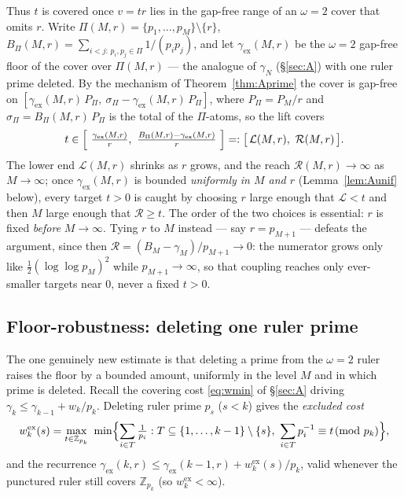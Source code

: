 \documentclass[11pt]{amsart}
\theoremstyle{plain}
\theoremstyle{definition}
\newcommand{\Z}{\mathbb{Z}}
\begin{document}
Thus $t$ is covered once $v=tr$ lies in the gap-free range of an $\omega=2$ cover
that omits $r$.  Write $\Pi(M,r)=\{p_1,\dots,p_M\}\setminus\{r\}$,
$B_\Pi(M,r)=\sum_{i<j:\,p_i,p_j\in\Pi}1/(p_ip_j)$, and let
$\gamma_{\mathrm{ex}}(M,r)$ be the $\omega=2$ gap-free floor of the cover over
$\Pi(M,r)$ --- the analogue of $\gamma_N$ (\S\ref{sec:A}) with one ruler prime
deleted.  By the mechanism of Theorem~\ref{thm:Aprime} the cover is gap-free on
$[\gamma_{\mathrm{ex}}(M,r)\,P_\Pi,\ \sigma_\Pi-\gamma_{\mathrm{ex}}(M,r)\,P_\Pi]$,
where $P_\Pi=P_M/r$ and $\sigma_\Pi=B_\Pi(M,r)\,P_\Pi$ is the total of the
$\Pi$-atoms, so the lift covers
\[
  t\in\Bigl[\ \tfrac{\gamma_{\mathrm{ex}}(M,r)}{r},\ \tfrac{B_\Pi(M,r)-\gamma_{\mathrm{ex}}(M,r)}{r}\ \Bigr]
  =:\bigl[\,\mathcal{L}(M,r),\ \mathcal{R}(M,r)\,\bigr].
\]
The lower end $\mathcal{L}(M,r)$ shrinks as $r$ grows, and the reach $\mathcal{R}(M,r)\to\infty$ as
$M\to\infty$; once $\gamma_{\mathrm{ex}}(M,r)$ is bounded \emph{uniformly in $M$
and $r$} (Lemma~\ref{lem:Aunif} below), every target $t>0$ is caught by choosing
$r$ large enough that $\mathcal{L}<t$ and then $M$ large enough that $\mathcal{R}\ge t$.  The
order of the two choices is essential: $r$ is fixed \emph{before} $M\to\infty$.
Tying $r$ to $M$ instead --- say $r=p_{M+1}$ --- defeats the argument, since then
$\mathcal{R}=(B_M-\gamma_M)/p_{M+1}\to0$: the numerator grows only like
$\tfrac12(\log\log p_M)^2$ while $p_{M+1}\to\infty$, so that coupling reaches only
ever-smaller targets near $0$, never a fixed $t>0$.

\subsection{Floor-robustness: deleting one ruler prime}
The one genuinely new estimate is that deleting a prime from the $\omega=2$ ruler
raises the floor by a bounded amount, uniformly in the level $M$ and in which prime
is deleted.  Recall the covering cost \eqref{eq:wmin} of \S\ref{sec:A} driving
$\gamma_k\le\gamma_{k-1}+w_k/p_k$.  Deleting ruler prime $p_s$ ($s<k$) gives the
\emph{excluded cost}
\begin{equation}\label{eq:wexcl}
  w_k^{\mathrm{ex}}(s)=\max_{t\in\Z_{p_k}}\ \min\Bigl\{\sum_{i\in T}\tfrac1{p_i}:
  T\subseteq\{1,\dots,k-1\}\setminus\{s\},\ \sum_{i\in T}p_i^{-1}\equiv t\!\!\pmod{p_k}\Bigr\},
\end{equation}
and the recurrence $\gamma_{\mathrm{ex}}(k,r)\le\gamma_{\mathrm{ex}}(k-1,r)
+w_k^{\mathrm{ex}}(s)/p_k$, valid whenever the punctured ruler still covers
$\Z_{p_k}$ (so $w_k^{\mathrm{ex}}<\infty$).
\end{document}
